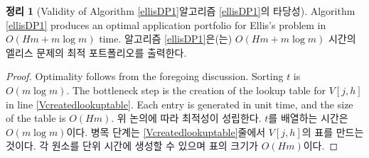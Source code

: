 \documentclass[11pt]{article} %
\newtheorem{theorem}{Theorem}
\theoremstyle{definition}
\newtheorem{theorem}{정리}
\theoremstyle{definition}
\begin{document}
\ifen {
\begin{algorithm}[h] 
\caption{Dynamic program for Ellis's problem with integral application costs.} \label{ellisDP1}
\KwIn{Utility values $t \in(0, \infty)^m$, admissions probabilities $f \in (0, 1]^m$, application costs $g \in \mathbb{N}^m$, budget $H \in\mathbb{N}$.}
Index schools in ascending order by $t$\;
Fill a lookup table with the values of $V[j, h]$\; \label{Vcreatedlookuptable}
$h \gets H$\;
$\mathcal{X} \gets \O$\;
\For{$j = m, m-1, \dots, 1$}{
	\If{$V[j-1, h] < V[j, h]$}{
		$\mathcal{X} \gets \mathcal{X}\cup\{j\}$\; 
		$h \gets h - g_j$\;
	}
}
\Return{$\mathcal{X}$}
\end{algorithm}
} \else {
\begin{algorithm}[h] 
\caption{정수 지원 비용의 엘리스 문제를 위한 동적 계획 해법.} \label{ellisDP1}
\KwIn{효용 모수 $t \in(0, \infty)^m$, 합격 확률 $f \in (0, 1]^m$, 지원 비용 $g \in \mathbb{N}^m$, 예산 $H \in\mathbb{N}$.}
$t$의 순서대로 학교를 배열한다\;
$V[j, h]$의 값으로 표를 채운다\; \label{Vcreatedlookuptable}
$h \gets H$\;
$\mathcal{X} \gets \O$\;
\For{$j = m, m-1, \dots, 1$}{
	\If{$V[j-1, h] < V[j, h]$}{
		$\mathcal{X} \gets \mathcal{X}\cup\{j\}$\; 
		$h \gets h - g_j$\;
	}
}
\Return{$\mathcal{X}$}
\end{algorithm}
}\fi

\begin{theorem}[\ifen Validity of Algorithm \ref{ellisDP1}\else 알고리즘 \ref{ellisDP1}의 타당성\fi]
\ifen 
Algorithm \ref{ellisDP1} produces an optimal application portfolio for Ellis's problem in $O(H m + m \log m)$ time.
\else
알고리즘 \ref{ellisDP1}은(는) $O(H m + m \log m)$ 시간의 엘리스 문제의 최적 포트폴리오를 출력한다.
\fi
\end{theorem}

\begin{proof}
\ifen
Optimality follows from the foregoing discussion. Sorting $t$ is $O(m \log m)$. The bottleneck step is the creation of the lookup table for $V[j, h]$ in line \ref{Vcreatedlookuptable}. Each entry is generated in unit time, and the size of the table is $O(Hm)$. 
\else
위 논의에 따라 최적성이 성립한다. $t$를 배열하는 시간은 $O(m \log m)$이다. 병목 단계는 \ref{Vcreatedlookuptable}줄에서 $V[j, h]$의 표를 만드는 것이다. 각 원소를 단위 시간에 생성할 수 있으며 표의 크기가 $O(Hm)$이다.
\fi
\end{proof}
\end{document}

